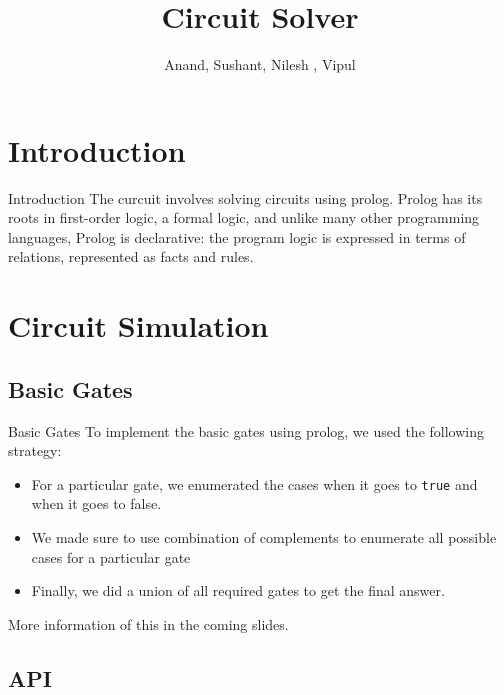 \documentclass{beamer}
\title[Circuit Solver]{Circuit Solver}
\author{Anand, Sushant, Nilesh , Vipul}
\institute{IIT Bombay}
\begin{document}
\begin{frame}
  \titlepage
\end{frame}

\section{Introduction}

\begin{frame}{Introduction}
The curcuit involves solving circuits using prolog.
\vskip 1cm
Prolog has its roots in first-order logic, a formal logic, and unlike many other programming languages, Prolog is declarative: the program logic is expressed in terms of relations, represented as facts and rules.

\end{frame}

\section{Circuit Simulation}

\subsection{Basic Gates}

\begin{frame}{Basic Gates}
To implement the basic gates using prolog, we used the following strategy:
\newline
\begin{itemize}
\item For a particular gate, we enumerated the cases when it goes to \texttt{true} and when it goes to {false}.
\item We made sure to use combination of complements to enumerate all possible cases for a particular gate
\item Finally, we did a union of all required gates to get the final answer.
\end{itemize}
More information of this in the coming slides.
\end{frame}

\subsection{API}
\end{document}
